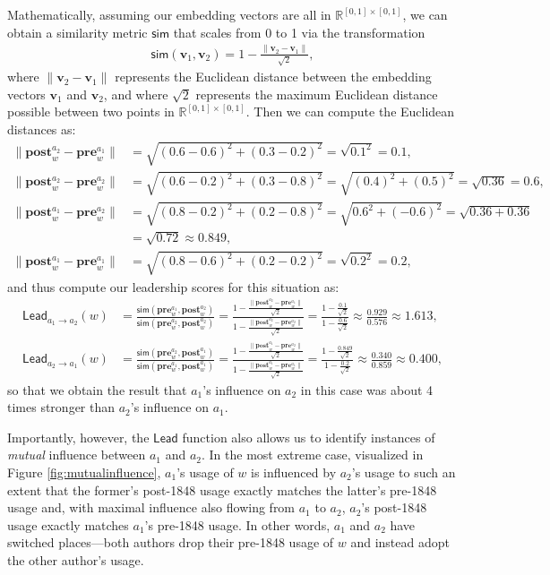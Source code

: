 \documentclass[11pt]{article}
\newcommand{\prevec}[2]{\mathbf{pre}_{#1}^{#2}}
\newcommand{\postvec}[2]{\mathbf{post}_{#1}^{#2}}
\newcommand{\Lead}[2]{\mathsf{Lead}_{#1 \rightarrow #2}}
\newcommand{\Sim}[0]{\mathsf{sim}}
\begin{document}
Mathematically, assuming our embedding vectors are all in $\mathbb{R}^{[0,1]\times[0,1]}$, we can obtain a similarity metric $\Sim$ that scales from 0 to 1 via the transformation
\begin{align*}
	\Sim(\mathbf{v}_1, \mathbf{v}_2) = 1 - \frac{\|\mathbf{v}_2-\mathbf{v}_1\|}{\sqrt{2}},
\end{align*}
where $\|\mathbf{v}_2-\mathbf{v}_1\|$ represents the Euclidean distance between the embedding vectors $\mathbf{v}_1$ and $\mathbf{v}_2$, and where $\sqrt{2}$ represents the maximum Euclidean distance possible between two points in $\mathbb{R}^{[0,1]\times[0,1]}$. Then we can compute the Euclidean distances as:
\begin{align*}
	\|\postvec{w}{a_2} - \prevec{w}{a_1}\| &= \sqrt{(0.6-0.6)^2 + (0.3-0.2)^2} = \sqrt{0.1^2} = 0.1,\\
	\|\postvec{w}{a_2} - \prevec{w}{a_2}\| &= \sqrt{(0.6-0.2)^2 + (0.3-0.8)^2} = \sqrt{(0.4)^2 + (0.5)^2} = \sqrt{0.36} = 0.6,\\
	\|\postvec{w}{a_1} - \prevec{w}{a_2}\| &= \sqrt{(0.8-0.2)^2 + (0.2-0.8)^2} = \sqrt{0.6^2 + (-0.6)^2} = \sqrt{0.36 + 0.36} \\
	&= \sqrt{0.72} \approx 0.849,\\
	\|\postvec{w}{a_1} - \prevec{w}{a_1}\| &= \sqrt{(0.8-0.6)^2 + (0.2-0.2)^2} = \sqrt{0.2^2} = 0.2,
\end{align*}
and thus compute our leadership scores for this situation as:
\begin{align*}
	\Lead{a_1}{a_2}(w) &= \frac{\Sim(\prevec{w}{a_1}, \postvec{w}{a_2})}{\Sim(\prevec{w}{a_2}, \postvec{w}{a_2})} = \frac{1 - \frac{\|\postvec{w}{a_2} - \prevec{w}{a_1}\|}{\sqrt{2}}}{1 - \frac{\|\postvec{w}{a_2}-\prevec{w}{a_2}\|}{\sqrt{2}}} = \frac{1-\frac{0.1}{\sqrt{2}}}{1-\frac{0.6}{\sqrt{2}}} \approx \frac{0.929}{0.576} \approx 1.613,\\
	\Lead{a_2}{a_1}(w) &= \frac{\Sim(\prevec{w}{a_2}, \postvec{w}{a_1})}{\Sim(\prevec{w}{a_1}, \postvec{w}{a_1})} = \frac{1 - \frac{\|\postvec{w}{a_1} - \prevec{w}{a_2}\|}{\sqrt{2}}}{1 - \frac{\|\postvec{w}{a_1}-\prevec{w}{a_1}\|}{\sqrt{2}}} = \frac{1-\frac{0.849}{\sqrt{2}}}{1-\frac{0.2}{\sqrt{2}}} \approx \frac{0.340}{0.859} \approx 0.400,
\end{align*}
so that we obtain the result that $a_1$'s influence on $a_2$ in this case was about 4 times stronger than $a_2$'s influence on $a_1$.

Importantly, however, the $\mathsf{Lead}$ function also allows us to identify instances of \textit{mutual} influence between $a_1$ and $a_2$. In the most extreme case, visualized in Figure \ref{fig:mutualinfluence}, $a_1$'s usage of $w$ is influenced by $a_2$'s usage to such an extent that the former's post-1848 usage exactly matches the latter's pre-1848 usage and, with maximal influence also flowing from $a_1$ to $a_2$, $a_2$'s post-1848 usage exactly matches $a_1$'s pre-1848 usage. In other words, $a_1$ and $a_2$ have switched places---both authors drop their pre-1848 usage of $w$ and instead adopt the other author's usage.
\end{document}
